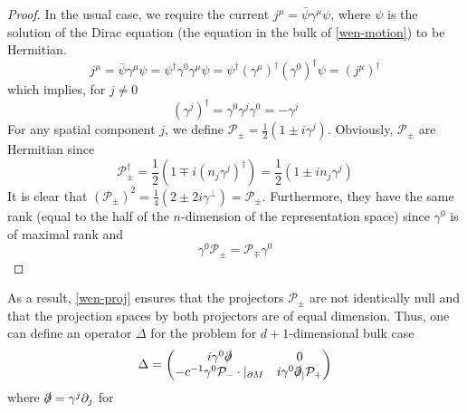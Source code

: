 \begin{proof}
In the usual case, we require the current $j^\mu = \bar{\psi} \gamma^\mu \psi $, where $\psi$ is the solution of the Dirac equation (the equation in the bulk of \cref{wen-motion}) to be Hermitian.
\ie 
\begin{equation*}
j^\mu 
= \bar{\psi}\gamma^\mu\psi 
= \psi^\dagger\gamma^0 \gamma^\mu \psi
= \psi^\dagger(\gamma^\mu)^\dagger (\gamma^0)^\dagger \psi
=  (j^\mu)^\dagger
\end{equation*}
which implies, for $j \neq 0$
\begin{equation*}
(\gamma^j)^\dagger = \gamma^0\gamma^j\gamma^0 = -\gamma^j
\end{equation*}
For any spatial component $j$, we define $\mathcal{P}_\pm = \frac{1}{2}(1 \pm i\gamma^j)$.
Obviously, $\mathcal{P}_\pm$ are Hermitian since
\begin{equation*}
\mathcal{P}_\pm^\dagger = 
\frac{1}{2}(1 \mp i (n_j \gamma^j)^\dagger)=
\frac{1}{2}(1 \pm i n_j \gamma^j)
\end{equation*}
It is clear that $(\mathcal{P}_\pm)^{2} = \frac{1}{4}(2\pm 2i \gamma^\bot) = \mathcal{P}_\pm$.
Furthermore, they have the same rank (equal to the half of the $n$-dimension of the representation space) since $\gamma^0$ is of maximal rank and
\begin{equation*}
\gamma^0\mathcal{P}_\pm = \mathcal{P}_\mp\gamma^0
\end{equation*}
\end{proof}
As a result, \cref{wen-proj} ensures that the projectors $\mathcal{P}_\pm$ are not identically null and that the projection spaces by both projectors are of equal dimension. 
Thus, one can define an operator $\Delta$ for the problem for $d+1$-dimensional bulk case
\begin{equation}\label{wen-hamiltonian}
\Delta = \begin{pmatrix}
i \gamma^0 \slashed{\partial}  & 0 \\
-c^{-1} \gamma^0 \mathcal{P}_- \cdot \vert_{\partial M}&  i\gamma^0 \slashed{\partial}_| \mathcal{P}_+
\end{pmatrix}
\end{equation}
where $\slashed{\partial} = \gamma^j\partial_j$ for
